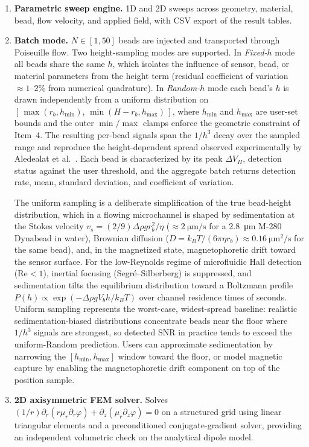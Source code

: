 \documentclass[preprint,12pt,a4paper]{elsarticle}
\begin{document}
\begin{enumerate}
\item \textbf{Parametric sweep engine.} 1D and 2D sweeps across geometry, material, bead, flow velocity, and applied field, with CSV export of the result tables.

\item \textbf{Batch mode.} $N \in [1,50]$ beads are injected and transported through Poiseuille flow. Two height-sampling modes are supported. In \textit{Fixed-$h$} mode all beads share the same $h$, which isolates the influence of sensor, bead, or material parameters from the height term (residual coefficient of variation $\approx 1$--$2\%$ from numerical quadrature). In \textit{Random-$h$} mode each bead's $h$ is drawn independently from a uniform distribution on $[\,\max(r_b,h_{\min}),\,\min(H-r_b,h_{\max})\,]$, where $h_{\min}$ and $h_{\max}$ are user-set bounds and the outer $\min/\max$ clamps enforce the geometric constraint of Item~4. The resulting per-bead signals span the $1/h^3$ decay over the sampled range and reproduce the height-dependent spread observed experimentally by Aledealat et al.\ \cite{aledealat2009}. Each bead is characterized by its peak $\Delta V_H$, detection status against the user threshold, and the aggregate batch returns detection rate, mean, standard deviation, and coefficient of variation.

The uniform sampling is a deliberate simplification of the true bead-height distribution, which in a flowing microchannel is shaped by sedimentation at the Stokes velocity $v_s = (2/9)\Delta\rho g r_b^2/\eta$ ($\approx \SI{2}{\micro\meter\per\second}$ for a \SI{2.8}{\micro\meter} M-280 Dynabead in water), Brownian diffusion ($D = k_B T/(6\pi\eta r_b) \approx \SI{0.16}{\micro\meter\squared\per\second}$ for the same bead), and, in the magnetized state, magnetophoretic drift toward the sensor surface. For the low-Reynolds regime of microfluidic Hall detection ($\text{Re} < 1$), inertial focusing (Segr\'{e}--Silberberg) is suppressed, and sedimentation tilts the equilibrium distribution toward a Boltzmann profile $P(h) \propto \exp(-\Delta\rho g V_b h/k_B T)$ over channel residence times of seconds. Uniform sampling represents the worst-case, widest-spread baseline: realistic sedimentation-biased distributions concentrate beads near the floor where $1/h^3$ signals are strongest, so detected SNR in practice tends to exceed the uniform-Random prediction. Users can approximate sedimentation by narrowing the $[h_{\min},h_{\max}]$ window toward the floor, or model magnetic capture by enabling the magnetophoretic drift component on top of the position sample.

\item \textbf{2D axisymmetric FEM solver.} Solves $(1/r)\partial_r(r\mu_r\partial_r\varphi) + \partial_z(\mu_r \partial_z\varphi) = 0$ on a structured grid using linear triangular elements and a preconditioned conjugate-gradient solver, providing an independent volumetric check on the analytical dipole model.
\end{enumerate}
\end{document}
